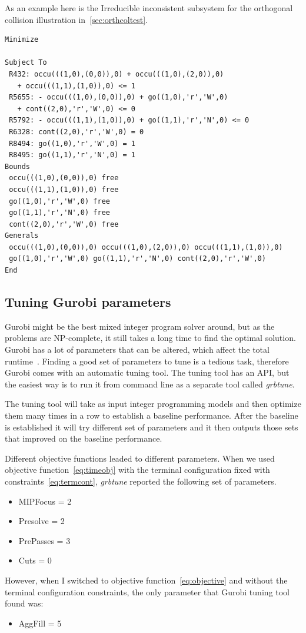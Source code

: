 As an example here is the Irreducible inconsistent subsystem for the orthogonal
collision illustration in~\autoref{sec:orthcoltest}.
\begin{verbatim}
Minimize
 
Subject To
 R432: occu(((1,0),(0,0)),0) + occu(((1,0),(2,0)),0)
   + occu(((1,1),(1,0)),0) <= 1
 R5655: - occu(((1,0),(0,0)),0) + go((1,0),'r','W',0)
   + cont((2,0),'r','W',0) <= 0
 R5792: - occu(((1,1),(1,0)),0) + go((1,1),'r','N',0) <= 0
 R6328: cont((2,0),'r','W',0) = 0
 R8494: go((1,0),'r','W',0) = 1
 R8495: go((1,1),'r','N',0) = 1
Bounds
 occu(((1,0),(0,0)),0) free
 occu(((1,1),(1,0)),0) free
 go((1,0),'r','W',0) free
 go((1,1),'r','N',0) free
 cont((2,0),'r','W',0) free
Generals
 occu(((1,0),(0,0)),0) occu(((1,0),(2,0)),0) occu(((1,1),(1,0)),0)
 go((1,0),'r','W',0) go((1,1),'r','N',0) cont((2,0),'r','W',0)
End
\end{verbatim}
\subsection{Tuning Gurobi parameters}
Gurobi might be the best mixed integer program solver around, but as the
problems are NP-complete, it still takes a long time to find the optimal
solution. Gurobi has a lot of parameters that can be altered, which affect the
total runtime~\cite{gurobiparams}. Finding a good set of parameters to tune is
a tedious task, therefore Gurobi comes with an automatic tuning tool. The
tuning tool has an API, but the easiest way is to run it from command line as a
separate tool called \textit{grbtune}.

The tuning tool will take as input integer programming models and then optimize
them many times in a row to establish a baseline performance. After the
baseline is established it will try different set of parameters and it then
outputs those sets that improved on the baseline performance.

Different objective functions leaded to different parameters. When we used
objective function~\eqref{eq:timeobj} with the terminal configuration fixed
with constraints~\eqref{eq:termcont}, \textit{grbtune} reported the following
set of parameters.
\begin{itemize}
    \item MIPFocus = 2
    \item Presolve = 2
    \item PrePasses = 3
    \item Cuts = 0
\end{itemize}

However, when I switched to objective function~\eqref{eq:objective} and
without the terminal configuration constraints, the only parameter that Gurobi
tuning tool found was:
\begin{itemize}
    \item AggFill = 5
\end{itemize}
